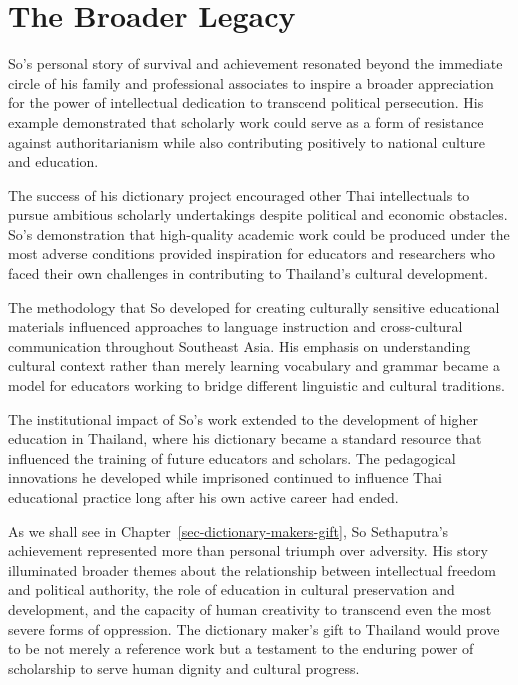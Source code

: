 \documentclass[
  Letterpaper,
]{scrbook}
\begin{document}
\section{The Broader Legacy}\label{the-broader-legacy}

So's personal story of survival and achievement resonated beyond the
immediate circle of his family and professional associates to inspire a
broader appreciation for the power of intellectual dedication to
transcend political persecution. His example demonstrated that scholarly
work could serve as a form of resistance against authoritarianism while
also contributing positively to national culture and education.

The success of his dictionary project encouraged other Thai
intellectuals to pursue ambitious scholarly undertakings despite
political and economic obstacles. So's demonstration that high-quality
academic work could be produced under the most adverse conditions
provided inspiration for educators and researchers who faced their own
challenges in contributing to Thailand's cultural development.

The methodology that So developed for creating culturally sensitive
educational materials influenced approaches to language instruction and
cross-cultural communication throughout Southeast Asia. His emphasis on
understanding cultural context rather than merely learning vocabulary
and grammar became a model for educators working to bridge different
linguistic and cultural traditions.

The institutional impact of So's work extended to the development of
higher education in Thailand, where his dictionary became a standard
resource that influenced the training of future educators and scholars.
The pedagogical innovations he developed while imprisoned continued to
influence Thai educational practice long after his own active career had
ended.

As we shall see in Chapter~\ref{sec-dictionary-makers-gift}, So
Sethaputra's achievement represented more than personal triumph over
adversity. His story illuminated broader themes about the relationship
between intellectual freedom and political authority, the role of
education in cultural preservation and development, and the capacity of
human creativity to transcend even the most severe forms of oppression.
The dictionary maker's gift to Thailand would prove to be not merely a
reference work but a testament to the enduring power of scholarship to
serve human dignity and cultural progress.
\end{document}
